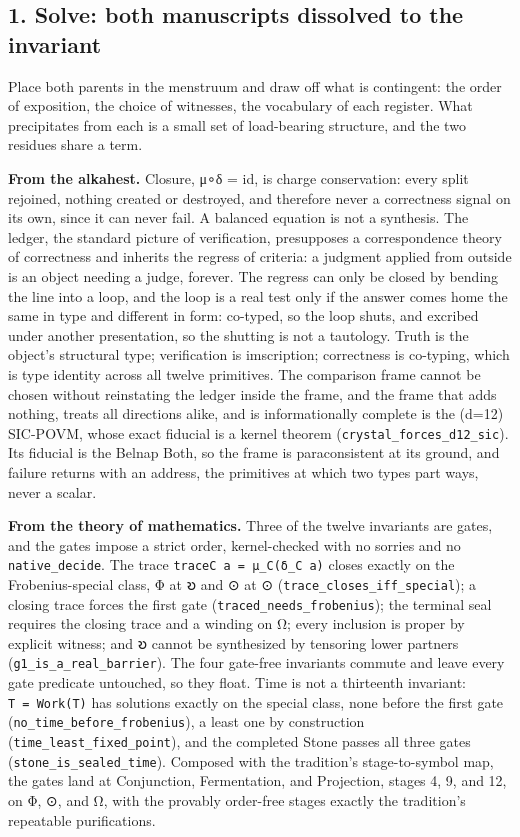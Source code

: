 \documentclass[12pt,a4paper]{article}
\begin{document}
\hypertarget{solve-both-manuscripts-dissolved-to-the-invariant}{%
\subsection{1. Solve: both manuscripts dissolved to the
invariant}\label{solve-both-manuscripts-dissolved-to-the-invariant}}

Place both parents in the menstruum and draw off what is contingent: the
order of exposition, the choice of witnesses, the vocabulary of each
register. What precipitates from each is a small set of load-bearing
structure, and the two residues share a term.

\textbf{From the alkahest.} Closure, μ∘δ = id, is charge conservation:
every split rejoined, nothing created or destroyed, and therefore never
a correctness signal on its own, since it can never fail. A balanced
equation is not a synthesis. The ledger, the standard picture of
verification, presupposes a correspondence theory of correctness and
inherits the regress of criteria: a judgment applied from outside is an
object needing a judge, forever. The regress can only be closed by
bending the line into a loop, and the loop is a real test only if the
answer comes home the same in type and different in form: co-typed, so
the loop shuts, and excribed under another presentation, so the shutting
is not a tautology. Truth is the object's structural type; verification
is imscription; correctness is co-typing, which is type identity across
all twelve primitives. The comparison frame cannot be chosen without
reinstating the ledger inside the frame, and the frame that adds
nothing, treats all directions alike, and is informationally complete is
the (d=12) SIC-POVM, whose exact fiducial is a kernel theorem
(\texttt{crystal\_forces\_d12\_sic}). Its fiducial is the Belnap Both,
so the frame is paraconsistent at its ground, and failure returns with
an address, the primitives at which two types part ways, never a scalar.

\textbf{From the theory of mathematics.} Three of the twelve invariants
are gates, and the gates impose a strict order, kernel-checked with no
sorries and no \texttt{native\_decide}. The trace
\texttt{traceC\ a\ =\ μ\_C(δ\_C\ a)} closes exactly on the
Frobenius-special class, Φ at 𐑹 and ⊙ at ⊙
(\texttt{trace\_closes\_iff\_special}); a closing trace forces the first
gate (\texttt{traced\_needs\_frobenius}); the terminal seal requires the
closing trace and a winding on Ω; every inclusion is proper by explicit
witness; and 𐑹 cannot be synthesized by tensoring lower partners
(\texttt{g1\_is\_a\_real\_barrier}). The four gate-free invariants
commute and leave every gate predicate untouched, so they float. Time is
not a thirteenth invariant: \texttt{T\ =\ Work(T)} has solutions exactly
on the special class, none before the first gate
(\texttt{no\_time\_before\_frobenius}), a least one by construction
(\texttt{time\_least\_fixed\_point}), and the completed Stone passes all
three gates (\texttt{stone\_is\_sealed\_time}). Composed with the
tradition's stage-to-symbol map, the gates land at Conjunction,
Fermentation, and Projection, stages 4, 9, and 12, on Φ, ⊙, and Ω, with
the provably order-free stages exactly the tradition's repeatable
purifications.
\end{document}
